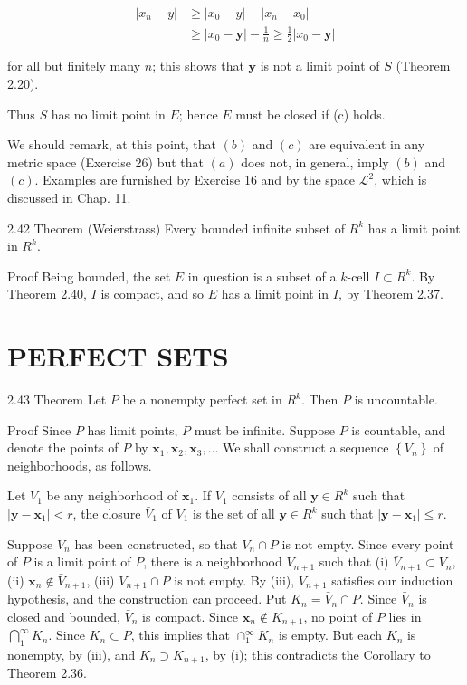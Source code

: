 \documentclass[10pt]{article}
\begin{document}
$$
\begin{aligned}
\left|x_{n}-y\right| & \geq\left|x_{0}-y\right|-\left|x_{n}-x_{0}\right| \\
& \geq\left|x_{0}-\mathbf{y}\right|-\frac{1}{n} \geq \frac{1}{2}\left|x_{0}-\mathbf{y}\right|
\end{aligned}
$$

for all but finitely many $n$; this shows that $\mathbf{y}$ is not a limit point of $S$ (Theorem 2.20).

Thus $S$ has no limit point in $E$; hence $E$ must be closed if (c) holds.

We should remark, at this point, that $(b)$ and $(c)$ are equivalent in any metric space (Exercise 26) but that $(a)$ does not, in general, imply $(b)$ and $(c)$. Examples are furnished by Exercise 16 and by the space $\mathscr{L}^{2}$, which is discussed in Chap. 11.

2.42 Theorem (Weierstrass) Every bounded infinite subset of $R^{k}$ has a limit point in $R^{k}$.

Proof Being bounded, the set $E$ in question is a subset of a $k$-cell $I \subset R^{k}$. By Theorem 2.40, $I$ is compact, and so $E$ has a limit point in $I$, by Theorem 2.37.

\section{PERFECT SETS}
2.43 Theorem Let $P$ be a nonempty perfect set in $R^{k}$. Then $P$ is uncountable.

Proof Since $P$ has limit points, $P$ must be infinite. Suppose $P$ is countable, and denote the points of $P$ by $\mathbf{x}_{1}, \mathbf{x}_{2}, \mathbf{x}_{3}, \ldots$ We shall construct a sequence $\left\{V_{n}\right\}$ of neighborhoods, as follows.

Let $V_{1}$ be any neighborhood of $\mathbf{x}_{1}$. If $V_{1}$ consists of all $\mathbf{y} \in R^{k}$ such that $\left|\mathbf{y}-\mathbf{x}_{1}\right|<r$, the closure $\bar{V}_{1}$ of $V_{1}$ is the set of all $\mathbf{y} \in R^{k}$ such that $\left|\mathbf{y}-\mathbf{x}_{1}\right| \leq r$.

Suppose $V_{n}$ has been constructed, so that $V_{n} \cap P$ is not empty. Since every point of $P$ is a limit point of $P$, there is a neighborhood $V_{n+1}$ such that (i) $\bar{V}_{n+1} \subset V_{n}$, (ii) $\mathbf{x}_{n} \notin \bar{V}_{n+1}$, (iii) $V_{n+1} \cap P$ is not empty. By (iii), $V_{n+1}$ satisfies our induction hypothesis, and the construction can proceed. Put $K_{n}=\bar{V}_{n} \cap P$. Since $\bar{V}_{n}$ is closed and bounded, $\bar{V}_{n}$ is compact. Since $\mathbf{x}_{n} \notin K_{n+1}$, no point of $P$ lies in $\bigcap_{1}^{\infty} K_{n}$. Since $K_{n} \subset P$, this implies that $\cap_{1}^{\infty} K_{n}$ is empty. But each $K_{n}$ is nonempty, by (iii), and $K_{n} \supset K_{n+1}$, by (i); this contradicts the Corollary to Theorem 2.36.
\end{document}
